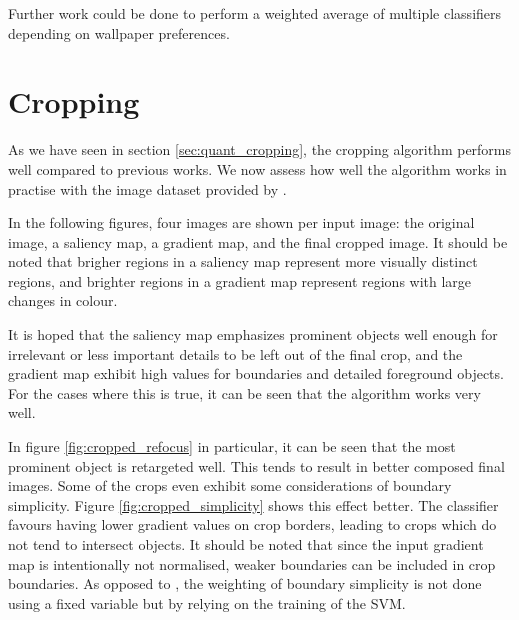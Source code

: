 Further work could be done to perform a weighted average of multiple classifiers
depending on wallpaper preferences.

\newpage
\section{Cropping\label{sec:qualitative_cropping}}

As we have seen in section \ref{sec:quant_cropping}, the cropping algorithm performs well compared to previous works.
We now assess how well the algorithm works in practise with the image dataset provided by \cite{fang2014automatic}.

In the following figures, four images are shown per input image: the original
image, a saliency map, a gradient map, and the final cropped image.
It should be noted that brigher regions in a saliency map represent more
visually distinct regions, and brighter regions in a gradient map represent
regions with large changes in colour.

It is hoped that the saliency map emphasizes prominent objects well enough for
irrelevant or less important details to be left out of the final crop, and the
gradient map exhibit high values for boundaries and detailed foreground objects.
For the cases where this is true, it can be seen that the algorithm works very
well.

In figure \ref{fig:cropped_refocus} in particular, it can be seen that the most
prominent object is retargeted well.
This tends to result in better composed final images.
Some of the crops even exhibit some considerations of boundary simplicity.
Figure \ref{fig:cropped_simplicity} shows this effect better.
The classifier favours having lower gradient values on crop borders, leading to
crops which do not tend to intersect objects.
It should be noted that since the input gradient map is intentionally not
normalised, weaker boundaries can be included in crop boundaries.
As opposed to \cite{fang2014automatic}, the weighting of boundary simplicity is
not done using a fixed variable but by relying on the training of the SVM.

